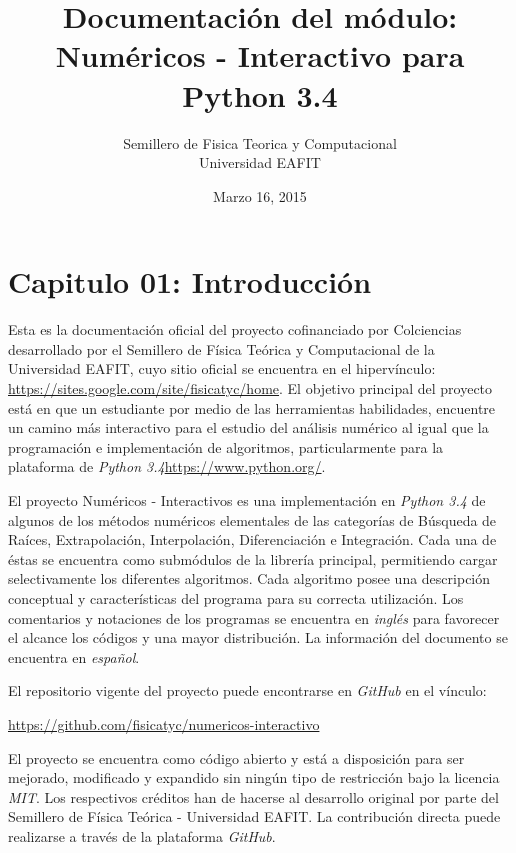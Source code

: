 \documentclass[letterpaper,10pt,oneside]{sphinxmanual}
\title{Documentación del módulo: \\ Numéricos - Interactivo para Python 3.4}
\date{Marzo 16, 2015}
\author{Semillero de Fisica Teorica y Computacional \\ Universidad EAFIT}
\theoremstyle{plain}%
\theoremstyle{definition}%
\theoremstyle{remark}%
\begin{document}
\maketitle
\tableofcontents
{}\label{Índice::doc}

\chapter{Capitulo 01: Introducción}
\label{chapter01::doc}\label{chapter01:capitulo-01-Introducción}


\noindent Esta es la documentación oficial del proyecto cofinanciado por Colciencias desarrollado por el Semillero de Física Teórica y Computacional de la Universidad EAFIT, cuyo sitio oficial se encuentra en el hipervínculo: \href{https://sites.google.com/site/fisicatyc/home}{https://sites.google.com/site/fisicatyc/home}. El objetivo principal del proyecto está en que un estudiante por medio de las herramientas habilidades, encuentre un camino más interactivo para el estudio del análisis numérico al igual que la programación e implementación de algoritmos, particularmente para la plataforma de \textit{Python 3.4}\href{https://www.python.org/}{https://www.python.org/}.

El proyecto Numéricos - Interactivos es una implementación en \textit{Python 3.4} de algunos de los métodos numéricos
elementales de las categorías de Búsqueda de Raíces, Extrapolación, Interpolación, Diferenciación e Integración. Cada una de éstas se encuentra como submódulos de la librería principal, permitiendo cargar selectivamente los diferentes algoritmos. Cada algoritmo posee una descripción conceptual y características del programa para su correcta utilización. Los comentarios y notaciones de los programas se encuentra en \textit{inglés} para favorecer el alcance los códigos y una mayor distribución. La información del documento se encuentra en \textit{español}.

El repositorio vigente del proyecto puede encontrarse en \textit{GitHub} en el vínculo:

\href{https://github.com/fisicatyc/numericos-interactivo}{https://github.com/fisicatyc/numericos-interactivo}

El proyecto se encuentra como código abierto y está a disposición para ser mejorado, modificado y expandido sin ningún tipo de restricción bajo la licencia \textit{MIT}. Los respectivos créditos han de hacerse al desarrollo original por parte del Semillero de Física Teórica - Universidad EAFIT. La contribución directa puede realizarse a través de la plataforma \textit{GitHub}.
\end{document}

